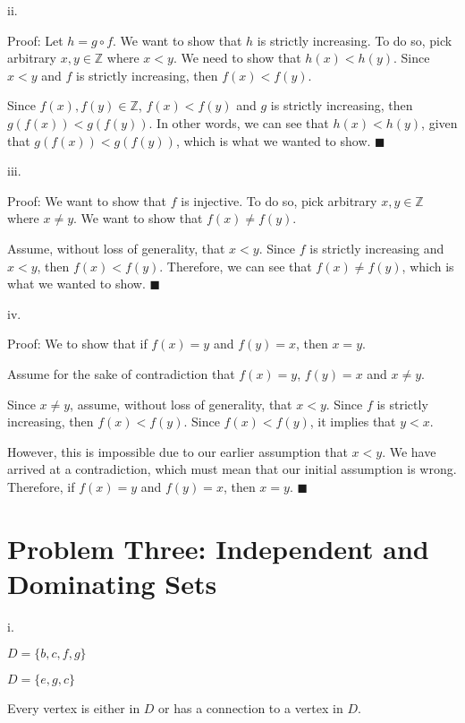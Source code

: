 \documentclass{article}
\renewcommand{\(}{\left(}
\renewcommand{\)}{\right)}
\theoremstyle{plain}
\theoremstyle{plain}
\theoremstyle{definition}
\begin{document}
    ii.
    \begin{shaded}
        Proof: Let $h=g\circ f$. We want to show that $h$ is strictly increasing. To do so, pick arbitrary $x,y\in\mathbb{Z}$ where $x<y$. We need to show that $h(x)<h(y)$. Since $x<y$ and $f$ is strictly increasing, then $f(x)<f(y)$.

        \vspace{4mm}

        Since $f(x),f(y)\in\mathbb{Z}$, $f(x)<f(y)$ and $g$ is strictly increasing, then $g(f(x))<g(f(y))$. In other words, we can see that $h(x)<h(y)$, given that $g(f(x))<g(f(y))$, which is what we wanted to show. $\blacksquare$
    \end{shaded}
    
    iii.
    \begin{shaded}
        Proof: We want to show that $f$ is injective. To do so, pick arbitrary $x,y\in\mathbb{Z}$ where $x\neq y$. We want to show that $f(x)\neq f(y)$.

        \vspace{4mm}

        Assume, without loss of generality, that $x<y$. Since $f$ is strictly increasing and $x<y$, then $f(x)<f(y)$. Therefore, we can see that $f(x)\neq f(y)$, which is what we wanted to show. $\blacksquare$
    \end{shaded}
    
    iv.
    \begin{shaded}
        Proof: We to show that if $f(x)=y$ and $f(y)=x$, then $x=y$.

        Assume for the sake of contradiction that $f(x)=y$, $f(y)=x$ and $x\neq y$.
        
        \vspace{4mm}

        Since $x\neq y$, assume, without loss of generality, that $x<y$. Since $f$ is strictly increasing, then $f(x)<f(y)$. Since $f(x)<f(y)$, it implies that $y<x$.
       
        \vspace{4mm}

        However, this is impossible due to our earlier assumption that $x<y$. We have arrived at a contradiction, which must mean that our initial assumption is wrong. Therefore, if $f(x)=y$ and $f(y)=x$, then $x=y$. $\blacksquare$
    \end{shaded}
    
\newpage

\section*{Problem Three: Independent and Dominating Sets}
    i.
    \begin{shaded}
        $D=\{b,c,f,g\}$

        $D=\{e,g,c\}$

        Every vertex is either in $D$ or has a connection to a vertex in $D$.
    \end{shaded}
    
\end{document}
